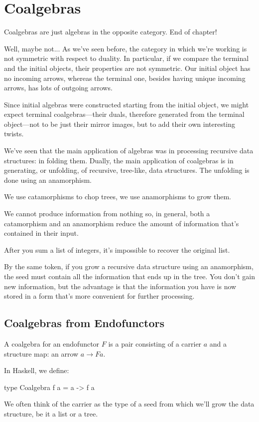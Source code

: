 \documentclass[DaoFP]{subfiles}
\begin{document}
\setcounter{chapter}{12}

\chapter{Coalgebras}

Coalgebras are just algebras in the opposite category. End of chapter!

Well, maybe not... As we've seen before, the category in which we're working is not symmetric with respect to duality. In particular, if we compare the terminal and the initial objects, their properties are not symmetric. Our initial object has no incoming arrows, whereas the terminal one, besides having unique incoming arrows, has lots of outgoing arrows. 

Since initial algebras were constructed starting from the initial object, we might expect terminal coalgebras---their duals, therefore generated from the terminal object---not to be just their mirror images, but to add their own interesting twists.

We've seen that the main application of algebras was in processing recursive data structures: in folding them. Dually, the main application of coalgebras is in generating, or unfolding, of recursive, tree-like, data structures. The unfolding is done using an anamorphism.

We use catamorphisms to chop trees, we use anamorphisms to grow them. 

We cannot produce information from nothing so, in general, both a catamorphism and an anamorphism reduce the amount of information that's contained in their input. 

After you sum a list of integers, it's impossible to recover the original list. 

By the same token, if you grow a recursive data structure using an anamorphism, the seed must contain all the information that ends up in the tree. You don't gain new information, but the advantage is that the information you have is now stored in a form that's more convenient for further processing.

\section{Coalgebras from Endofunctors}

A coalgebra for an endofunctor $F$ is a pair consisting of a carrier $a$ and a structure map: an arrow $a \to F a$. 

In Haskell, we define:
\begin{haskell}
 type Coalgebra f a = a -> f a
\end{haskell}
We often think of the carrier as the type of a seed from which we'll grow the data structure, be it a list or a tree. 
\end{document}
